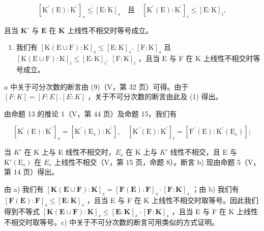 \[
\left[ \mathrm{K} ^ {\prime} (\mathrm{E}): \mathrm{K} ^ {\prime} \right] _ {s} \leqslant \left[ \mathrm{E}: \mathrm{K} \right] _ {s} \quad \text{且} \quad \left[ \mathrm{K} ^ {\prime} (\mathrm{E}): \mathrm{K} ^ {\prime} \right] _ {i} \leqslant \left[ \mathrm{E}: \mathrm{K} \right] _ {i},
\]

且当 \(\mathbf{K}'\) 与 \(\mathbf{E}\) 在 \(\mathbf{K}\) 上线性不相交时等号成立。

\begin{enumerate}
\def\labelenumi{\alph{enumi})}
\setcounter{enumi}{2}
\tightlist
\item
  我们有 \([\mathrm{K}(\mathrm{E}\cup \mathrm{F}):\mathrm{K}]_s\leqslant [\mathrm{E}:\mathrm{K}]_s.\) \([\mathrm{F}:\mathrm{K}]_s\) 且 \([\mathrm{K}(\mathrm{E}\cup \mathrm{F}):\mathrm{K}]_i\leqslant [\mathrm{E}:\mathrm{K}]_i.\) \([\mathrm{F}:\mathrm{K}]_i\) ，且当 E 与 F 在 K 上线性不相交时等号成立。
\end{enumerate}

\(a\) 中关于可分次数的断言由 (9)（V，第 32 页）可得。由于 \([F:K] = [F:E].[E:K]\) ，关于不可分次数的断言由此及 (1) 得出。

由命题 13 的推论 1（V，第 44 页）及命题 15，我们有

\[
\left[ \mathrm{K} ^ {\prime} (\mathrm{E}): \mathrm{K} ^ {\prime} \right] _ {s} = \left[ \mathrm{K} ^ {\prime} \left(\mathrm{E} _ {s}\right): \mathrm{K} ^ {\prime} \right], \quad \left[ \mathrm{K} ^ {\prime} (\mathrm{E}): \mathrm{K} ^ {\prime} \right] _ {i} = \left[ \mathrm{F} ^ {\prime} (\mathrm{E}): \mathrm{K} ^ {\prime} \left(\mathrm{E} _ {s}\right) \right];\tag{2}
\]

当 \(K'\) 在 K 上与 E 线性不相交时，\(E_{s}\) 在 K 上与 \(K'\) 线性不相交，且 E 与 \(\mathrm{K}'(\mathrm{E}_{s})\) 在 \(E_{s}\) 上线性不相交（V，第 15 页，命题 8）。断言 b) 现由命题 5（V，第 14 页）得出。

由 a) 我们有 \([\mathbf{K}(\mathbf{E}\cup\mathbf{F}):\mathbf{K}]_{s}=[\mathbf{F}(\mathbf{E}):\mathbf{F}]_{s}\cdot[\mathbf{F}:\mathbf{K}]_{s}\) ；由 b) 我们有 \([\mathbf{F}(\mathbf{E}):\mathbf{F}]_{s}\leqslant[\mathbf{E}:\mathbf{K}]_{s}\) ，且当 E 与 F 在 K 上线性不相交时取等号。因此我们得到不等式 \([\mathbf{K}(\mathbf{E}\cup\mathbf{F}):\mathbf{K}]_{s}\leqslant[\mathbf{E}:\mathbf{K}]_{s}\cdot[\mathbf{F}:\mathbf{K}]_{s}\) ，且当 E 与 F 在 K 上线性不相交时取等号。c) 中关于不可分次数的断言可用类似的方式证明。

